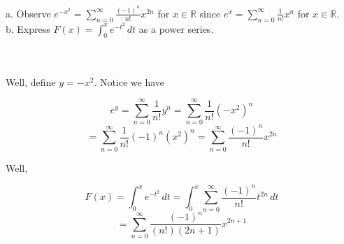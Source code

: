 a. Observe $e^{-x^2}=\sum_{n=0}^{\infty}\frac{(-1)^n}{n!}x^{2n}$ for $x\in\mathbb{R}$ since
$e^x=\sum_{n=0}^{\infty}\frac{1}{n!}x^{n}$ for $x\in\mathbb{R}$.\\

b. Express $F(x)=\int_{0}^{x} e^{-t^2} \,dt$ as a power series.\\\\

\begin{solution}\renewcommand{\qedsymbol}{}\ \\
    Well, define $y=-x^2$. Notice we have
    
    $$e^y=\sum_{n=0}^{\infty}\frac{1}{n!}y^{n}=\sum_{n=0}^{\infty}\frac{1}{n!}(-x^2)^{n}$$
    $$=\sum_{n=0}^{\infty}\frac{1}{n!}(-1)^n(x^2)^{n}=\sum_{n=0}^{\infty}\frac{(-1)^n}{n!}x^{2n}$$

    Well,
    
    $$F(x)=\int_{0}^{x} e^{-t^2} \,dt=\int_{0}^{x}\sum_{n=0}^{\infty}\frac{(-1)^n}{n!}t^{2n}\,dt$$
    $$=\sum_{n=0}^{\infty}\frac{(-1)^n}{(n!)(2n+1)}x^{2n+1}$$


\end{solution}